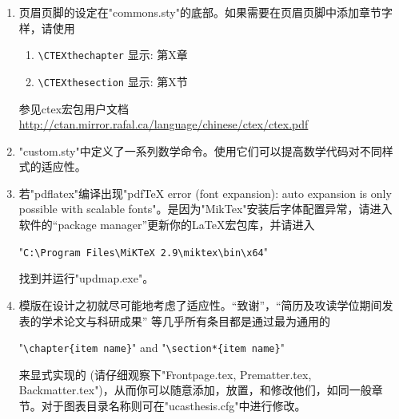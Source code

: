 \begin{enumerate}
      在"Thesis.tex"中设置启用adobe的字体:

      \verb+\documentclass[doublesided,fontset=adobe]{Style/ucasthesis}%+

      如果\LaTeX{}软件版本比较老旧，如Linux用户，ctex宏包没有更新，设置启用adobe的字体则为:

      \verb+\documentclass[doublesided,adobefonts]{Style/ucasthesis}%+
     
     最后推荐选择"xelatex"编译引擎编译。

     因为模版的设定考虑兼顾不同操作系统(Windows, Linux, Mac OS)并兼顾pdflatex和xelatex，为了模版的健壮性，上述方案并未作为原始设定。
  \item 页眉页脚的设定在"commons.sty"的底部。如果需要在页眉页脚中添加章节字样，请使用
      \begin{enumerate}
          \item \verb+\CTEXthechapter+  显示: 第X章
          \item \verb+\CTEXthesection+  显示: 第X节
      \end{enumerate}
      参见ctex宏包用户文档\url{http://ctan.mirror.rafal.ca/language/chinese/ctex/ctex.pdf}
  \item "custom.sty"中定义了一系列数学命令。使用它们可以提高数学代码对不同样式的适应性。
  \item 若"pdflatex"编译出现"pdfTeX error (font expansion): auto expansion is only possible with scalable fonts"。是因为"MikTex"安装后字体配置异常，请进入软件的“package manager”更新你的\LaTeX{}宏包库，并请进入
      
      "\verb+C:\Program Files\MiKTeX 2.9\miktex\bin\x64+"

       找到并运行"updmap.exe"。
   \item 模版在设计之初就尽可能地考虑了适应性。“致谢”，“简历及攻读学位期间发表的学术论文与科研成果”
       等几乎所有条目都是通过最为通用的
       
       "\verb+\chapter{item name}+"  and "\verb+\section*{item name}+"

       来显式实现的 (请仔细观察下"Frontpage.tex, Prematter.tex, Backmatter.tex")，从而你可以随意添加，放置，和修改他们，如同一般章节。对于图表目录名称则可在"ucasthesis.cfg"中进行修改。
\end{enumerate}


